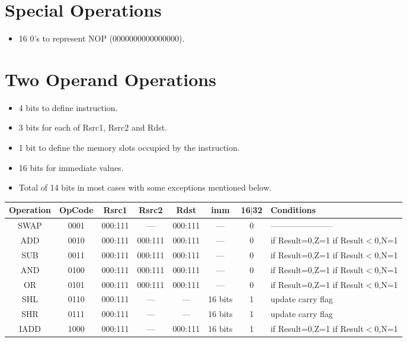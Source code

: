 \documentclass[12pt]{report}
\begin{document}
\section{Special Operations}
\begin{itemize}
    \item 16 0's to represent NOP (0000000000000000).
\end{itemize}

\section{Two Operand Operations}
\begin{itemize}
    \item 4 bits to define instruction.
    \item 3 bits for each of Rsrc1, Rsrc2 and Rdst.
    \item 1 bit to define the memory slots occupied by the instruction.
    \item 16 bits for immediate values.
    \item Total of 14 bits in most cases with some exceptions mentioned below.
\end{itemize}
\begin{center}
 \begin{tabular}{||c| c| c| c| c| c| c| p{30mm}||} 
 \hline
 Operation & OpCode & Rsrc1 & Rsrc2 & Rdst & imm & 16$|$32 & Conditions  \\ [0.5ex] 
 \hline\hline
 SWAP & 0001 & 000:111 & --- & 000:111 & --- & 0 & ----------------------- \\
 \hline
 ADD & 0010 & 000:111 & 000:111 & 000:111 & --- & 0 & if Result=0,Z=1 \newline if Result$<$0,N=1 \\
 \hline
 SUB & 0011 & 000:111 & 000:111 & 000:111 & --- & 0 & if Result=0,Z=1 \newline if Result$<$0,N=1 \\
 \hline
 AND & 0100 & 000:111 & 000:111 & 000:111 & --- & 0 & if Result=0,Z=1 \newline if Result$<$0,N=1 \\
 \hline
 OR & 0101 & 000:111 & 000:111 & 000:111 & --- & 0 & if Result=0,Z=1 \newline if Result$<$0,N=1 \\
 \hline
 SHL & 0110 & 000:111 & --- & --- & 16 bits & 1 & update carry flag \\
 \hline
 SHR & 0111 & 000:111 & --- & --- & 16 bits & 1 & update carry flag \\
 \hline
 IADD & 1000 & 000:111 & --- & 000:111 & 16 bits & 1 & if Result=0,Z=1 \newline if Result$<$0,N=1 \\
 \hline
\end{tabular}
\end{center}
\end{document}
